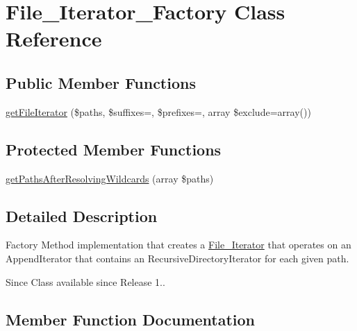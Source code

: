 \hypertarget{class_file___iterator___factory}{}\section{File\+\_\+\+Iterator\+\_\+\+Factory Class Reference}
\label{class_file___iterator___factory}
\subsection*{Public Member Functions}
\begin{DoxyCompactItemize}
\item 
\mbox{\hyperlink{class_file___iterator___factory_a8318db3f161a5223d97cbd7a85fcc6fb}{get\+File\+Iterator}} (\$paths, \$suffixes=\textquotesingle{}\textquotesingle{}, \$prefixes=\textquotesingle{}\textquotesingle{}, array \$exclude=array())
\end{DoxyCompactItemize}
\subsection*{Protected Member Functions}
\begin{DoxyCompactItemize}
\item 
\mbox{\hyperlink{class_file___iterator___factory_acf9b86aaa9c6a3342e12b29f6c5ba752}{get\+Paths\+After\+Resolving\+Wildcards}} (array \$paths)
\end{DoxyCompactItemize}


\subsection{Detailed Description}
Factory Method implementation that creates a \mbox{\hyperlink{class_file___iterator}{File\+\_\+\+Iterator}} that operates on an Append\+Iterator that contains an Recursive\+Directory\+Iterator for each given path.

\begin{DoxySince}{Since}
Class available since Release 1.. 
\end{DoxySince}


\subsection{Member Function Documentation}
\mbox{\label{class_file___iterator___factory_a8318db3f161a5223d97cbd7a85fcc6fb}} 
